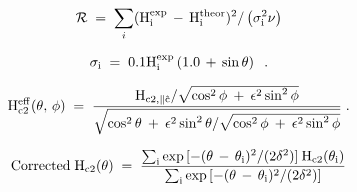 {\newpage
\clearpage
\samepage \begin{equation}{\cal R} \; = \; \sum_i \rm (H_i^{exp} \, - \, H_i^{theor})^2 /
\left( \sigma_i^2 \nu \right)
\label{residef}
\end{equation}
}

{\newpage
\clearpage
\samepage \begin{displaymath}%
\rm  \sigma_i  \; = \; 0.1  H_i^{\rm exp} \left(1.0 \, + \, \sin\theta
\right) \; \; .
\end{displaymath}
}

{\newpage
\clearpage
\samepage \begin{equation}%
\label{tilthc2}
\rm H_{c2}^{eff}(\theta,\, \phi) \; = \; \frac{H_{c2, \parallel
\hat{c}}/\sqrt{\cos^2\phi \: + \: \epsilon^2\sin^2\phi}}{\sqrt{\cos^2\theta
\: + \: \epsilon^2\sin^2\theta / \sqrt{\cos^2\phi \: + \: \epsilon^2\sin^2\phi}}} \; .
\end{equation}
}

{\newpage
\clearpage
\samepage \begin{figure}%



\vspace{6in}

\label{misalign}
\end{figure}
}

{\newpage
\clearpage
\samepage \begin{figure}\vspace{4.5in}

\label{tilteffect}
\end{figure}
}

{\newpage
\clearpage
\samepage \begin{equation}%
\label{mostheta}
\rm Corrected \; H_{c2}(\theta) \; = \; \frac{\sum_{i} \exp{[-(\theta \, -
\, \theta_i)^2/(2 \delta^2)]} \: H_{c2}(\theta_i)}{\sum_{i} \exp{[-(\theta
\, - \, \theta_i)^2/(2\delta^2)]}}
\end{equation}
}

{\newpage
\clearpage
\samepage \begin{figure}\vspace{4.5in}

\label{mospread}
\end{figure}
}

{\newpage
\clearpage
\samepage \begin{figure}\vspace{4.5in}

\label{ninety-tangent}
\end{figure}
}

